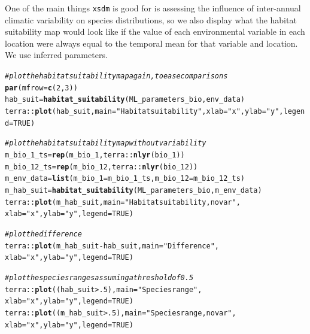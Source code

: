 \documentclass[11pt]{article}\usepackage[]{graphicx}\usepackage[]{xcolor}
\makeatletter
\newcommand{\hlnum}[1]{\textcolor[rgb]{0.686,0.059,0.569}{#1}}%
\newcommand{\hlsng}[1]{\textcolor[rgb]{0.192,0.494,0.8}{#1}}%
\newcommand{\hlcom}[1]{\textcolor[rgb]{0.678,0.584,0.686}{\textit{#1}}}%
\newcommand{\hlopt}[1]{\textcolor[rgb]{0,0,0}{#1}}%
\newcommand{\hldef}[1]{\textcolor[rgb]{0.345,0.345,0.345}{#1}}%
\newcommand{\hlkwb}[1]{\textcolor[rgb]{0.69,0.353,0.396}{#1}}%
\newcommand{\hlkwc}[1]{\textcolor[rgb]{0.333,0.667,0.333}{#1}}%
\newcommand{\hlkwd}[1]{\textcolor[rgb]{0.737,0.353,0.396}{\textbf{#1}}}%
\newenvironment{kframe}{%
 \def\at@end@of@kframe{}%
 \ifinner\ifhmode%
  \def\at@end@of@kframe{\end{minipage}}%
  \begin{minipage}{\columnwidth}%
 \fi\fi%
 \def\FrameCommand##1{\hskip\@totalleftmargin \hskip-\fboxsep
 \colorbox{shadecolor}{##1}\hskip-\fboxsep
     \hskip-\linewidth \hskip-\@totalleftmargin \hskip\columnwidth}%
 \MakeFramed {\advance\hsize-\width
   \@totalleftmargin\z@ \linewidth\hsize
   \@setminipage}}%
 {\par\unskip\endMakeFramed%
 \at@end@of@kframe}
\newenvironment{knitrout}{}{} %
\makeatother
\begin{document}
One of the main things \texttt{xsdm} is good for is assessing 
the influence of inter-annual climatic variability on species distributions,
so we also display what the habitat suitability map would look like if the value of 
each environmental variable in each location were always equal to the temporal
mean for that variable and location. We use inferred parameters.
\begin{knitrout}
\color{fgcolor}\begin{kframe}
\begin{alltt}
\hlcom{#plot the habitat suitability map again, to ease comparisons}
\hlkwd{par}\hldef{(}\hlkwc{mfrow}\hldef{=}\hlkwd{c}\hldef{(}\hlnum{2}\hldef{,}\hlnum{3}\hldef{))}
\hldef{hab_suit} \hlkwb{=} \hlkwd{habitat_suitability}\hldef{(ML_parameters_bio, env_data)}
\hldef{terra}\hlopt{::}\hlkwd{plot}\hldef{(hab_suit,}\hlkwc{main}\hldef{=}\hlsng{"Habitat suitability"}\hldef{,}\hlkwc{xlab}\hldef{=}\hlsng{"x"}\hldef{,}\hlkwc{ylab}\hldef{=}\hlsng{"y"}\hldef{,}\hlkwc{legend}\hldef{=}\hlnum{TRUE}\hldef{)}

\hlcom{#plot the habitat suitability map without variability}
\hldef{m_bio_1_ts} \hlkwb{=} \hlkwd{rep}\hldef{(m_bio_1,terra}\hlopt{::}\hlkwd{nlyr}\hldef{(bio_1))}
\hldef{m_bio_12_ts} \hlkwb{=} \hlkwd{rep}\hldef{(m_bio_12,terra}\hlopt{::}\hlkwd{nlyr}\hldef{(bio_12))}
\hldef{m_env_data}\hlkwb{=}\hlkwd{list}\hldef{(}\hlkwc{m_bio_1}\hldef{=m_bio_1_ts,}\hlkwc{m_bio_12}\hldef{=m_bio_12_ts)}
\hldef{m_hab_suit} \hlkwb{=} \hlkwd{habitat_suitability}\hldef{(ML_parameters_bio, m_env_data)}
\hldef{terra}\hlopt{::}\hlkwd{plot}\hldef{(m_hab_suit,}\hlkwc{main}\hldef{=}\hlsng{"Habitat suitability, no var"}\hldef{,}
            \hlkwc{xlab}\hldef{=}\hlsng{"x"}\hldef{,}\hlkwc{ylab}\hldef{=}\hlsng{"y"}\hldef{,}\hlkwc{legend}\hldef{=}\hlnum{TRUE}\hldef{)}

\hlcom{#plot the difference}
\hldef{terra}\hlopt{::}\hlkwd{plot}\hldef{(m_hab_suit}\hlopt{-}\hldef{hab_suit,}\hlkwc{main}\hldef{=}\hlsng{"Difference"}\hldef{,}
            \hlkwc{xlab}\hldef{=}\hlsng{"x"}\hldef{,}\hlkwc{ylab}\hldef{=}\hlsng{"y"}\hldef{,}\hlkwc{legend}\hldef{=}\hlnum{TRUE}\hldef{)}

\hlcom{#plot the species ranges assuming a threshold of 0.5}
\hldef{terra}\hlopt{::}\hlkwd{plot}\hldef{((hab_suit}\hlopt{>}\hlnum{.5}\hldef{),}\hlkwc{main}\hldef{=}\hlsng{"Species range"}\hldef{,}
            \hlkwc{xlab}\hldef{=}\hlsng{"x"}\hldef{,}\hlkwc{ylab}\hldef{=}\hlsng{"y"}\hldef{,}\hlkwc{legend}\hldef{=}\hlnum{TRUE}\hldef{)}
\hldef{terra}\hlopt{::}\hlkwd{plot}\hldef{((m_hab_suit}\hlopt{>}\hlnum{.5}\hldef{),}\hlkwc{main}\hldef{=}\hlsng{"Species range, no var"}\hldef{,}
            \hlkwc{xlab}\hldef{=}\hlsng{"x"}\hldef{,}\hlkwc{ylab}\hldef{=}\hlsng{"y"}\hldef{,}\hlkwc{legend}\hldef{=}\hlnum{TRUE}\hldef{)}


\end{alltt}
\end{kframe}
\end{knitrout}
\end{document}
